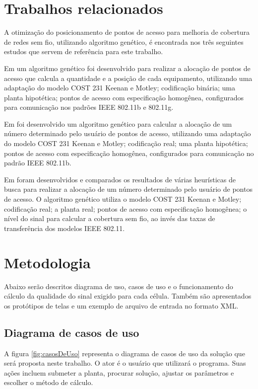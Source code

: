 \documentclass[tc,twoside]{iiufrgs}
\begin{document}
\chapter{Trabalhos relacionados} 

A otimização do posicionamento de pontos de acesso para melhoria de cobertura de redes sem fio, utilizando algoritmo genético, é encontrada nos três seguintes estudos que servem de referência para este trabalho.

Em \cite{ji2002methods} um algoritmo genético foi desenvolvido para realizar a alocação de pontos de acesso que calcula a quantidade e a posição de cada equipamento, utilizando uma adaptação do modelo COST 231 Keenan e Motley; codificação binária; uma planta hipotética; pontos de acesso com especificação homogênea, configurados para comunicação nos padrões IEEE 802.11b e 802.11g.

Em \cite{vellasco2010dimensionamento} foi desenvolvido um algoritmo genético para calcular a alocação de um número determinado pelo usuário de pontos de acesso, utilizando uma adaptação do modelo COST 231 Keenan e Motley; codificação real; uma planta hipotética; pontos de acesso com especificação homogênea, configurados para comunicação no padrão IEEE 802.11b.

Em \cite{nagy2012global} foram desenvolvidos e comparados os resultados de várias heurísticas de busca para realizar a alocação de um número determinado pelo usuário de pontos de acesso. O algoritmo genético utiliza o modelo COST 231 Keenan e Motley; codificação real; a planta real; pontos de acesso com especificação homogênea; o nível do sinal para calcular a cobertura sem fio, ao invés das taxas de transferência dos modelos IEEE 802.11.

\chapter{Metodologia} 

Abaixo serão descritos diagrama de uso, casos de uso e o funcionamento do cálculo da qualidade do sinal exigido para cada célula. Também são apresentados os protótipos de telas e um exemplo de arquivo de entrada no formato XML.

\section{Diagrama de casos de uso} 

A figura \ref{fig:casosDeUso} representa o diagrama de casos de uso da solução que será proposta neste trabalho. O ator é o usuário que utilizará o programa. Suas ações incluem submeter a planta, procurar solução, ajustar os parâmetros e escolher o método de cálculo.
\end{document}
